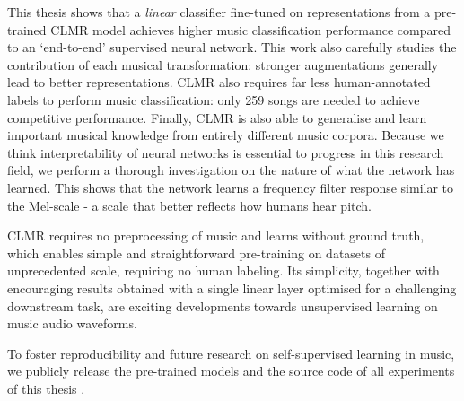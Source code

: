 This thesis shows that a \textit{linear} classifier fine-tuned on representations from a pre-trained CLMR model achieves higher music classification performance compared to an `end-to-end' supervised neural network. This work also carefully studies the contribution of each musical transformation: stronger augmentations generally lead to better representations. CLMR also requires far less human-annotated labels to perform music classification: only 259 songs are needed to achieve competitive performance. Finally, CLMR is also able to generalise and learn important musical knowledge from entirely different music corpora. Because we think interpretability of neural networks is essential to progress in this research field, we perform a thorough investigation on the nature of what the network has learned. This shows that the network learns a frequency filter response similar to the Mel-scale - a scale that better reflects how humans hear pitch.

CLMR requires no preprocessing of music and learns without ground truth, which enables simple and straightforward pre-training on datasets of unprecedented scale, requiring no human labeling. Its simplicity, together with encouraging results obtained with a single linear layer optimised for a challenging downstream task, are exciting developments towards unsupervised learning on music audio waveforms.


To foster reproducibility and future research on self-supervised learning in music, we publicly release the pre-trained models and the source code of all experiments of this thesis .




